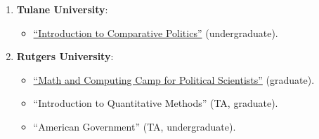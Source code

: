 \begin{enumerate}
\item {\bf Tulane University}:
  
    \begin{itemize}
      \item[\textcolor{gray}{\textbullet}] \href{https://github.com/hbahamonde/Comparative_Politics_UGRAD/raw/master/Bahamonde_Comparative_Politics_Syllabus_UGRAD.pdf}{``Introduction to Comparative Politics''} {\color{gray} (undergraduate)}.
    \end{itemize}

\item {\bf Rutgers University}:

    \begin{itemize}
      \item[\textcolor{gray}{\textbullet}] \href{http://github.com/hbahamonde/Math-Camp/raw/master/Syllabus/Math_Camp_Syllabus.pdf/}{``Math and Computing Camp for Political Scientists''} {\color{gray} (graduate)}.
      
      \item[\textcolor{gray}{\textbullet}] ``Introduction to Quantitative Methods'' {\color{gray} (TA, graduate)}.
      
      \item[\textcolor{gray}{\textbullet}] ``American Government'' {\color{gray} (TA, undergraduate)}.
    \end{itemize}

\end{enumerate}
